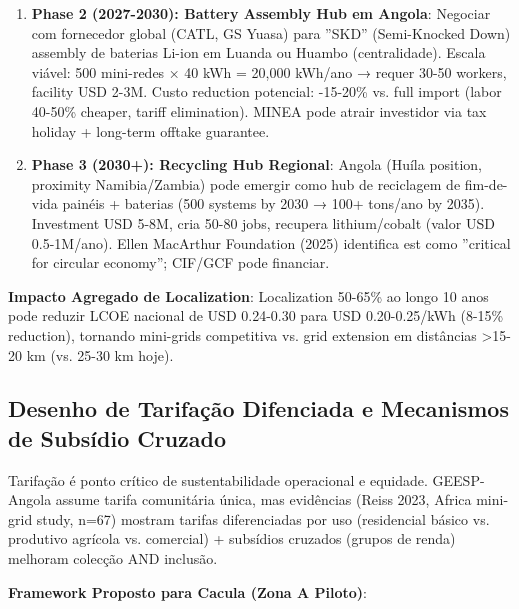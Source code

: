 \documentclass[12pt, a4paper]{article}
\begin{document}
{{{{{{{{{{{{\begin{enumerate}
\item \textbf{Phase 2 (2027-2030): Battery Assembly Hub em Angola}: Negociar com fornecedor global (CATL, GS Yuasa) para ''SKD'' (Semi-Knocked Down) assembly de baterias Li-ion em Luanda ou Huambo (centralidade). Escala viável: 500 mini-redes × 40 kWh = 20,000 kWh/ano → requer 30-50 workers, facility USD 2-3M. Custo reduction potencial: -15-20\% vs. full import (labor 40-50\% cheaper, tariff elimination). MINEA pode atrair investidor via tax holiday + long-term offtake guarantee.

\item \textbf{Phase 3 (2030+): Recycling Hub Regional}: Angola (Huíla position, proximity Namibia/Zambia) pode emergir como hub de reciclagem de fim-de-vida painéis + baterias (500 systems by 2030 → 100+ tons/ano by 2035). Investment USD 5-8M, cria 50-80 jobs, recupera lithium/cobalt (valor USD 0.5-1M/ano). Ellen MacArthur Foundation (2025) identifica est como ''critical for circular economy''; CIF/GCF pode financiar.
\end{enumerate}

\textbf{Impacto Agregado de Localization}: Localization 50-65\% ao longo 10 anos pode reduzir LCOE nacional de USD 0.24-0.30 para USD 0.20-0.25/kWh (8-15\% reduction), tornando mini-grids competitiva vs. grid extension em distâncias >15-20 km (vs. 25-30 km hoje).

\subsection{Desenho de Tarifação Difenciada e Mecanismos de Subsídio Cruzado}

Tarifação é ponto crítico de sustentabilidade operacional e equidade. GEESP-Angola assume tarifa comunitária única, mas evidências (Reiss 2023, Africa mini-grid study, n=67) mostram tarifas diferenciadas por uso (residencial básico vs. produtivo agrícola vs. comercial) + subsídios cruzados (grupos de renda) melhoram colecção AND inclusão.

\textbf{Framework Proposto para Cacula (Zona A Piloto)}: 

}}}}}}}}}}}}
\end{document}
